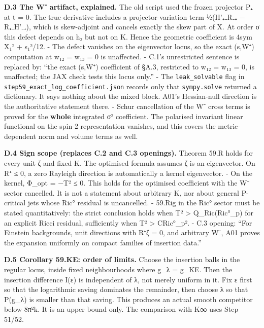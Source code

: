 \documentclass[
  10pt,
]{report}
\begin{document}
\textbf{D.3 The W⁻ artifact, explained.} The old script used the frozen
projector P₊ at t = 0. The true derivative includes a
projector-variation term ½(H'₊₋R₋₊ − R₊₋H'₋₊), which is skew-adjoint and
cancels exactly the skew part of X. At order σ this defect depends on h₂
but not on K. Hence the geometric coefficient is 4\textbar sym
X₁\textbar² + s₁²/12. - The defect vanishes on the eigenvector locus, so
the exact (s,W⁺) computation at w₁₂ = w₁₃ = 0 is unaffected. - C.1's
unrestricted sentence is replaced by: ``the exact (s,W⁺) coefficient of
§A.3, restricted to w₁₂ = w₁₃ = 0, is unaffected; the JAX check tests
this locus only.'' - The \texttt{leak\_solvable} flag in
\texttt{step59\_exact\_log\_coefficient.json} records only that
\texttt{sympy.solve} returned a dictionary. It says nothing about the
mixed block. A01's Hessian-null direction is the authoritative statement
there. - Schur cancellation of the W⁻ cross terms is proved for the
\textbf{whole} integrated σ² coefficient. The polarised invariant linear
functional on the spin-2 representation vanishes, and this covers the
metric-dependent norm and volume terms as well.

\textbf{D.4 Sign scope (replaces C.2 and C.3 openings).} Theorem 59.R
holds for every unit ζ and fixed K. The optimised formula assumes ζ is
an eigenvector. On R⁺ ≤ 0, a zero Rayleigh direction is automatically a
kernel eigenvector. - On the kernel, Φ\_opt = −\textbar T\textbar² ≤ 0.
This holds for the optimised coefficient with the W⁻ sector cancelled.
It is not a statement about arbitrary K, nor about general P-critical
jets whose Ric° residual is uncancelled. - 59.Rig in the Ric° sector
must be stated quantitatively: the strict conclusion holds when
\textbar T\textbar² \textgreater{} Q\_Ric(Ric°\_p) for an explicit Ricci
residual, sufficiently when \textbar T\textbar² \textgreater{}
C\textbar Ric°\_p\textbar². - C.3 opening: ``For Einstein backgrounds,
unit directions with R⁺ζ = 0, and arbitrary W⁻, A01 proves the expansion
uniformly on compact families of insertion data.''

\textbf{D.5 Corollary 59.KE: order of limits.} Choose the insertion
balls in the regular locus, inside fixed neighbourhoods where g\_λ =
g\_KE. Then the insertion difference I(ε) is independent of λ, not
merely uniform in it. Fix ε first so that the logarithmic saving
dominates the remainder, then choose λ so that P(g\_λ) is smaller than
that saving. This produces an actual smooth competitor below 8π²k. It is
an upper bound only. The comparison with K∞ uses Step 51/52.
\end{document}
